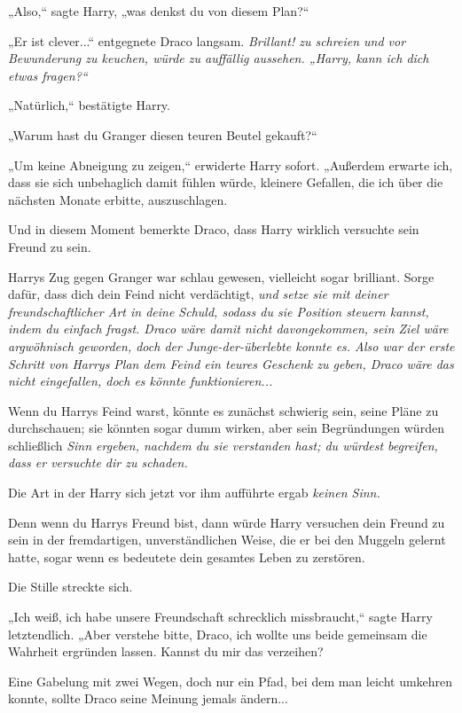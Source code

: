 {„Also,“ sagte Harry, „was denkst du von diesem Plan?“

„Er ist clever...“ entgegnete Draco langsam. \emph{Brillant! zu schreien und vor Bewunderung zu keuchen, würde zu auffällig aussehen. „Harry, kann ich dich etwas fragen?“}

„Natürlich,“ bestätigte Harry.

„Warum hast du Granger diesen teuren Beutel gekauft?“

„Um keine Abneigung zu zeigen,“ erwiderte Harry sofort. „Außerdem erwarte ich, dass sie sich unbehaglich damit fühlen würde, kleinere Gefallen, die ich über die nächsten Monate erbitte, auszuschlagen.

Und in diesem Moment bemerkte Draco, dass Harry wirklich versuchte sein Freund zu sein.

Harrys Zug gegen Granger war schlau gewesen, vielleicht sogar brilliant. Sorge dafür, dass dich dein Feind nicht verdächtigt, \emph{und setze sie mit deiner freundschaftlicher Art in deine Schuld, sodass du sie Position steuern kannst, indem du \emph{einfach fragst}. Draco wäre damit nicht davongekommen, sein Ziel wäre argwöhnisch geworden, doch der Junge-der-überlebte \emph{konnte} es. Also war der erste Schritt von Harrys Plan dem Feind ein teures Geschenk zu geben, Draco wäre das nicht eingefallen, doch es könnte \emph{funktionieren...}}

Wenn du Harrys Feind warst, könnte es zunächst schwierig sein, seine Pläne zu durchschauen; sie könnten sogar dumm wirken, aber sein Begründungen würden schließlich \emph{Sinn ergeben, nachdem du sie verstanden hast; du würdest begreifen, dass er versuchte dir zu schaden.}

Die Art in der Harry sich jetzt vor ihm aufführte ergab \emph{keinen Sinn.}

Denn wenn du Harrys Freund bist, dann würde Harry versuchen dein Freund zu sein in der fremdartigen, unverständlichen Weise, die er bei den Muggeln gelernt hatte, sogar wenn es bedeutete dein gesamtes Leben zu zerstören.

Die Stille streckte sich.

„Ich weiß, ich habe unsere Freundschaft schrecklich missbraucht,“ sagte Harry letztendlich. „Aber verstehe bitte, Draco, ich wollte uns beide gemeinsam die Wahrheit ergründen lassen. Kannst du mir das verzeihen?

Eine Gabelung mit zwei Wegen, doch nur ein Pfad, bei dem man leicht umkehren konnte, sollte Draco seine Meinung jemals ändern...

}
